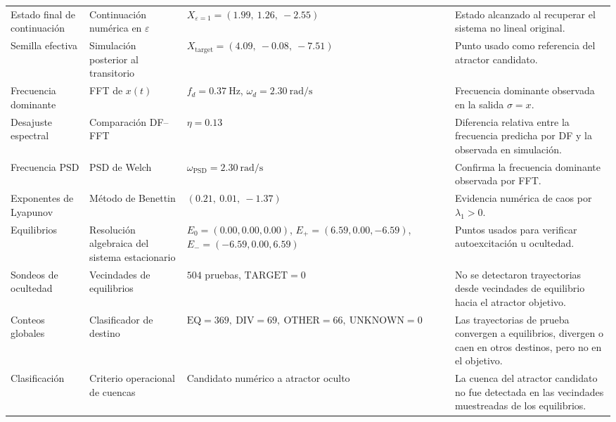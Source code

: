 \documentclass[journal]{IEEEtran}
\begin{document}
\begin{table}[htbp]
\begin{adjustbox}{max width=\textwidth}
\begin{tabular}{@{}L{2.7cm}L{3.4cm}L{4.4cm}L{5.8cm}@{}}
Estado final de continuación &
Continuación numérica en \(\varepsilon\) &
\(X_{\varepsilon=1}=(1.99,\ 1.26,\ -2.55)\) &
Estado alcanzado al recuperar el sistema no lineal original. \\

Semilla efectiva &
Simulación posterior al transitorio &
\(X_{\mathrm{target}}=(4.09,\ -0.08,\ -7.51)\) &
Punto usado como referencia del atractor candidato. \\

Frecuencia dominante &
FFT de \(x(t)\) &
\(f_d=0.37\ \mathrm{Hz}\), \(\omega_d=2.30\ \mathrm{rad/s}\) &
Frecuencia dominante observada en la salida \(\sigma=x\). \\

Desajuste espectral &
Comparación DF--FFT &
\(\eta=0.13\) &
Diferencia relativa entre la frecuencia predicha por DF y la observada en simulación. \\

Frecuencia PSD &
PSD de Welch &
\(\omega_{\mathrm{PSD}}=2.30\ \mathrm{rad/s}\) &
Confirma la frecuencia dominante observada por FFT. \\

Exponentes de Lyapunov &
Método de Benettin &
\((0.21,\ 0.01,\ -1.37)\) &
Evidencia numérica de caos por \(\lambda_1>0\). \\

Equilibrios &
Resolución algebraica del sistema estacionario &
\(E_0=(0.00,0.00,0.00)\), \(E_+=(6.59,0.00,-6.59)\), \(E_-=(-6.59,0.00,6.59)\) &
Puntos usados para verificar autoexcitación u ocultedad. \\

Sondeos de ocultedad &
Vecindades de equilibrios &
\(504\) pruebas, \(\mathrm{TARGET}=0\) &
No se detectaron trayectorias desde vecindades de equilibrio hacia el atractor objetivo. \\

Conteos globales &
Clasificador de destino &
\(\mathrm{EQ}=369,\ \mathrm{DIV}=69,\ \mathrm{OTHER}=66,\ \mathrm{UNKNOWN}=0\) &
Las trayectorias de prueba convergen a equilibrios, divergen o caen en otros destinos, pero no en el objetivo. \\

Clasificación &
Criterio operacional de cuencas &
Candidato numérico a atractor oculto &
La cuenca del atractor candidato no fue detectada en las vecindades muestreadas de los equilibrios. \\

\bottomrule
\end{tabular}
\end{adjustbox}
\end{table}
\end{document}
